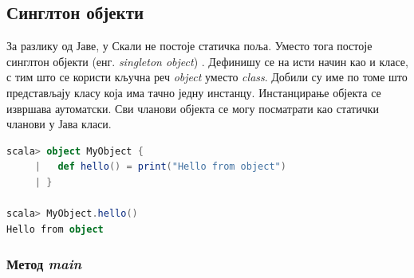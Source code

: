 \documentclass[12pt,oneside]{memoir}
\begin{document}
%

\subsection{Синглтон објекти}
\label{subsec:scala_sing_obj}

За разлику од Јаве, у Скали не постоје статичка поља. Уместо тога постоје синглтон објекти (енг. \textit{singleton object}) \cite{scala_prog}. Дефинишу се на исти начин као и класе, с тим што се користи кључна реч \textit{object} уместо \textit{class}. Добили су име по томе што представљају класу која има тачно једну инстанцу. Инстанцирање објекта се извршава аутоматски. Сви чланови објекта се могу посматрати као статички чланови у Јава класи.

\begin{lstlisting}[language=Scala, caption={Коришћење синглтон објекта}, label={lst:scala_oop_object_example}, basicstyle=\small]
scala> object MyObject {
     |   def hello() = print("Hello from object")
     | }

scala> MyObject.hello()
Hello from object
\end{lstlisting}

%
%
%
%
%

\subsubsection{Метод \textit{main}}
\label{subsubsec:scala_oop_main_app}
\end{document}
